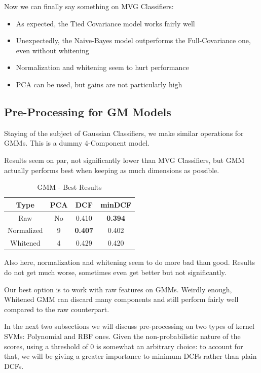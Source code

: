 \documentclass[12pt, twocolumn]{article}
\begin{document}
Now we can finally say something on MVG Classifiers:

\begin{itemize}
    \item As expected, the Tied Covariance model works fairly well
    \item Unexpectedly, the Naive-Bayes model outperforms the Full-Covariance one, even without whitening
    \item Normalization and whitening seem to hurt performance
    \item PCA can be used, but gains are not particularly high
\end{itemize}

\subsection{Pre-Processing for GM Models}

Staying of the subject of Gaussian Classifiers, we make similar operations for GMMs. 
This is a dummy 4-Component model.

Results seem on par, not significantly lower than MVG Classifiers, but GMM actually performs best when keeping as much dimensions as possible.

\begin{table}[H]
    \centering
        \begin{tabular}{||c|c|c|c||}
            \hline
            Type & PCA & DCF & minDCF \\
            \hline
            \hline
            Raw & No & 0.410 & {\bf 0.394}  \\
            Normalized &  9 & {\bf 0.407} & 0.402 \\
            Whitened & 4 & 0.429 & 0.420 \\
            \hline
    \end{tabular}
    \caption{GMM - Best Results}
\end{table}

Also here, normalization and whitening seem to do more bad than good. Results do not get much worse, sometimes even get better but not significantly.

Our best option is to work with raw features on GMMs. Weirdly enough, Whitened GMM can discard many components and still perform fairly well compared to the raw counterpart.


In the next two subsections we will discuss pre-processing on two types of kernel SVMs: Polynomial and RBF ones. 
Given the non-probabilistic nature of the scores, using a threshold of $0$ is somewhat an arbitrary choice: to account for that, we will be giving a greater importance to minimum DCFs rather than plain DCFs.
\end{document}
